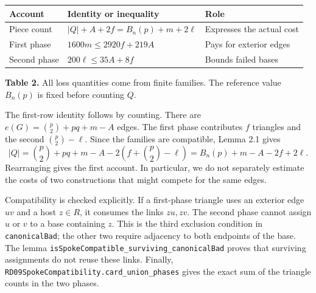 \documentclass[english,11pt,a4paper]{article}
\newcounter{none}
\begin{document}

{\def\LTcaptype{none} %
\begin{longtable}[c]{@{}
  >{\raggedright\arraybackslash}p{}
  >{\raggedright\arraybackslash}p{}
  >{\raggedright\arraybackslash}p{}@{}}
\toprule\noalign{}
\begin{minipage}[b]{\linewidth}\raggedright
Account
\end{minipage} & \begin{minipage}[b]{\linewidth}\raggedright
Identity or inequality
\end{minipage} & \begin{minipage}[b]{\linewidth}\raggedright
Role
\end{minipage} \\
\midrule\noalign{}
\endhead
\bottomrule\noalign{}
\endlastfoot
Piece count & \(|Q|+A+2f=B_n(p)+m+2\ell\) & Expresses the actual cost \\
First phase & \(1600m\le2920f+219A\) & Pays for exterior edges \\
Second phase & \(200\ell\le35A+8f\) & Bounds failed bases \\
\end{longtable}
}

\textbf{Table 2.} All loss quantities come from finite families. The reference value \(B_n(p)\) is fixed before counting \(Q\).

The first-row identity follows by counting. There are \(e(G)=\binom p2+pq+m-A\) edges. The first phase contributes \(f\) triangles and the second \(\binom p2-\ell\). Since the families are compatible, Lemma 2.1 gives \[
|Q|=\binom p2+pq+m-A-2\left(f+\binom p2-\ell\right)
=B_n(p)+m-A-2f+2\ell.
\tag{5.4a}
\] Rearranging gives the first account. In particular, we do not separately estimate the costs of two constructions that might compete for the same edges.

Compatibility is checked explicitly. If a first-phase triangle uses an exterior edge \(uv\) and a host \(z\in R\), it consumes the links \(zu,zv\). The second phase cannot assign \(u\) or \(v\) to a base containing \(z\). This is the third exclusion condition in \nolinkurl{canonicalBad}; the other two require adjacency to both endpoints of the base. The lemma \nolinkurl{isSpokeCompatible_surviving_canonicalBad} proves that surviving assignments do not reuse these links. Finally, \nolinkurl{RD09SpokeCompatibility.card_union_phases} gives the exact sum of the triangle counts in the two phases.
\end{document}

